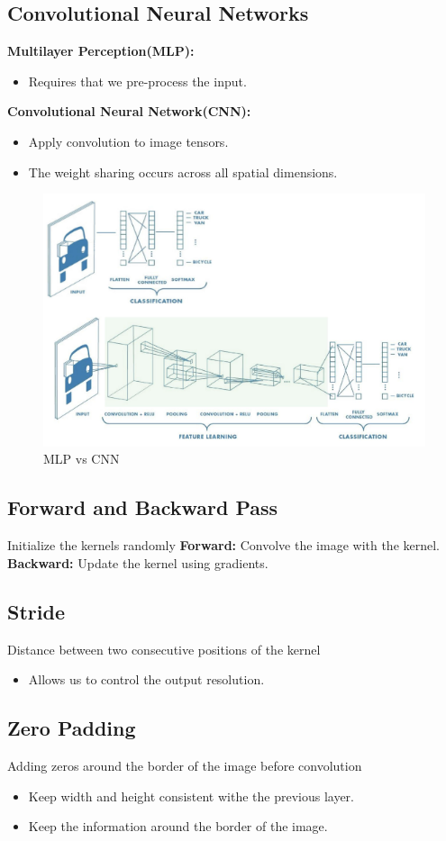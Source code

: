 \documentclass[11pt, english]{article}
\begin{document}
\subsection{Convolutional Neural Networks}
\textbf{Multilayer Perception(MLP): }
\begin{itemize}
    \item Requires that we pre-process the input.
\end{itemize}
\textbf{Convolutional Neural Network(CNN): }
\begin{itemize}
    \item Apply convolution to image tensors.
    \item The weight sharing occurs across all spatial dimensions.
\end{itemize}
\begin{figure}
    \centering
    \includegraphics[width=0.75\linewidth]{MLPCNN.png}
    \caption{MLP vs CNN}
    \label{fig:enter-label}
\end{figure}
\subsection{Forward and Backward Pass}
Initialize the kernels randomly 
\textbf{Forward:} Convolve the image with the kernel.
\textbf{Backward:} Update the kernel using gradients.
\subsection{Stride}
Distance between two consecutive positions of the kernel
\begin{itemize}
    \item Allows us to control the output resolution.
\end{itemize}
\subsection{Zero Padding}
Adding zeros around the border of the image before convolution
\begin{itemize}
    \item Keep width and height consistent withe the previous layer.
    \item Keep the information around the border of the image.
\end{itemize}
\end{document}
